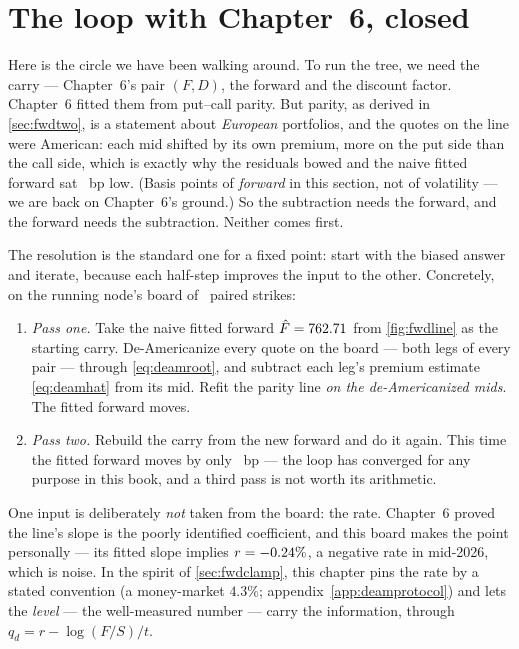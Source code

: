 \section{The loop with Chapter~6, closed}
\label{sec:deamloop}

Here is the circle we have been walking around.  To run the tree, we
need the carry --- Chapter~6's pair $(F,D)$, the forward and the
discount factor.  Chapter~6 fitted them from put--call parity.  But
parity, as derived in \cref{sec:fwdtwo}, is a statement about
\emph{European} portfolios, and the quotes on the line were American:
each mid shifted by its own premium, more on the put side than the
call side, which is exactly why the residuals bowed and the naive
fitted forward sat \MacDeamBowNaiveGapBp\ bp low.  (Basis points of
\emph{forward} in this section, not of volatility --- we are back on
Chapter~6's ground.)  So the subtraction needs the forward, and the
forward needs the subtraction.  Neither comes first.

The resolution is the standard one for a fixed point: start with the
biased answer and iterate, because each half-step improves the input
to the other.  Concretely, on the running node's board of
\MacDeamBowNPairs\ paired strikes:
\begin{enumerate}[leftmargin=1.8em,itemsep=2pt]
\item \emph{Pass one.}  Take the naive fitted forward
$\hat F=762.71$ from \cref{fig:fwdline} as the starting
carry.  De-Americanize every quote on the board --- both legs of
every pair --- through \eqref{eq:deamroot}, and subtract each leg's
premium estimate \eqref{eq:deamhat} from its mid.  Refit the parity
line \emph{on the de-Americanized mids}.  The fitted forward moves.
\item \emph{Pass two.}  Rebuild the carry from the new forward and do
it again.  This time the fitted forward moves by only
\MacDeamBowPassDeltaBp\ bp --- the loop has converged for any purpose
in this book, and a third pass is not worth its arithmetic.
\end{enumerate}
One input is deliberately \emph{not} taken from the board: the rate.
Chapter~6 proved the line's slope is the poorly identified
coefficient, and this board makes the point personally --- its fitted
slope implies $r=-0.24\%$, a negative rate in
mid-2026, which is noise.  In the spirit of
\cref{sec:fwdclamp}, this chapter pins the rate by a stated
convention (a money-market $4.3\%$; appendix~\ref{app:deamprotocol})
and lets the \emph{level} --- the well-measured number --- carry the
information, through $q_d=r-\log(F/S)/t$.

